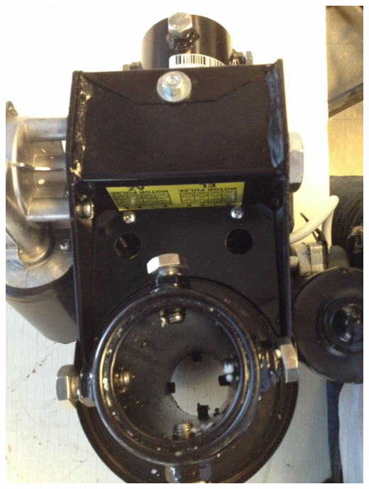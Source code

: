 \documentclass[11pt]{article} %
\begin{document}
\begin{center}
\includegraphics[scale=0.10]{wiring/02.jpeg}


\end{center}
\end{document}
